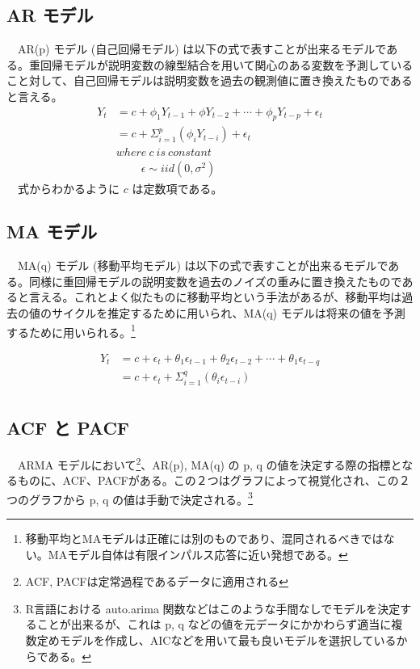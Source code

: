 \documentclass{scrartcl}
\begin{document}
\subsection{AR モデル}
\label{sec:org0622dbe}
　AR(p) モデル (自己回帰モデル) は以下の式で表すことが出来るモデルである。重回帰モデルが説明変数の線型結合を用いて関心のある変数を予測していること対して、自己回帰モデルは説明変数を過去の観測値に置き換えたものであると言える。\\
\begin{align}
Y_t &= c + \phi_1  Y_{t-1} +\phi Y_{t-2} + \cdots + \phi_p  Y_{t-p} + \epsilon_t \nonumber \\
&= c + \Sigma_{i=1}^{p} (\phi_i  Y_{t-i}) +\epsilon_t  \nonumber \\
&where \  c \ is\  constant \ \nonumber \\ 
&\ \ \ \ \ \ \ \ \ \ \epsilon \sim iid(0, \sigma^2)
\end{align}
　式からわかるように \(c\) は定数項である。\\
\subsection{MA モデル}
\label{sec:orgfd8eb6e}
　MA(q) モデル (移動平均モデル) は以下の式で表すことが出来るモデルである。同様に重回帰モデルの説明変数を過去のノイズの重みに置き換えたものであると言える。これとよく似たものに移動平均という手法があるが、移動平均は過去の値のサイクルを推定するために用いられ、MA(q) モデルは将来の値を予測するために用いられる。\footnote{移動平均とMAモデルは正確には別のものであり、混同されるべきではない。MAモデル自体は有限インパルス応答に近い発想である。\cite{2012カルマンフィルタの基礎}}

\begin{align}
Y_t &= c + \epsilon_t + \theta_1 \epsilon_{t-1} + \theta_2 \epsilon_{t-2} + \cdots + \theta_1 \epsilon_{t-q}   \nonumber \\
&= c + \epsilon_t + \Sigma_{i=1}^{q} (\theta_i \epsilon_{t-i})  \nonumber \\
\end{align}
\subsection{ACF と PACF}
\label{sec:orga0d47cc}
　ARMA モデルにおいて\footnote{ACF, PACFは定常過程であるデータに適用される}、AR(p), MA(q) の p, q の値を決定する際の指標となるものに、ACF、PACFがある。この２つはグラフによって視覚化され、この２つのグラフから p, q の値は手動で決定される。\footnote{R言語における auto.arima 関数などはこのような手間なしでモデルを決定することが出来るが、これは p, q などの値を元データにかかわらず適当に複数定めモデルを作成し、AICなどを用いて最も良いモデルを選択しているからである。} \cite{stat510}
\end{document}
